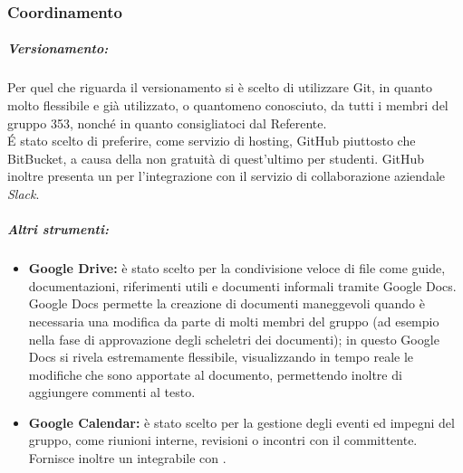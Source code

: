 	\subsubsection{Coordinamento}
\subparagraph{Versionamento:} Per quel che riguarda il versionamento si è scelto di utilizzare Git, in quanto molto flessibile e già utilizzato, o quantomeno conosciuto, da tutti i membri del gruppo 353, nonché in quanto consigliatoci dal Referente.\\
\'{E} stato scelto di preferire, come servizio di hosting, GitHub piuttosto che BitBucket, a causa della non gratuità di quest'ultimo per studenti. GitHub inoltre presenta un  per l'integrazione con il servizio di collaborazione aziendale \emph{Slack}.


\subparagraph{Altri strumenti:}
		\begin{itemize}
			\item \textbf{Google Drive:} è stato scelto per la condivisione veloce di file come guide, documentazioni, riferimenti utili e documenti informali tramite
			Google Docs. Google Docs permette la creazione di documenti
			maneggevoli quando è necessaria una modifica da parte di molti membri
			del gruppo (ad esempio nella fase di approvazione degli scheletri dei
			documenti); in questo Google Docs si rivela estremamente flessibile,
			visualizzando in tempo reale le modificheche sono apportate al documento,
			permettendo inoltre di aggiungere commenti al testo.
			\item \textbf{Google Calendar:} è stato scelto per la gestione degli eventi ed
			impegni del gruppo, come riunioni interne, revisioni o incontri con il committente. Fornisce inoltre un  integrabile con .
		\end{itemize}
	
